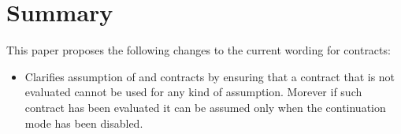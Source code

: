 \section{Summary}

This paper proposes the following changes to the current wording for contracts:

\begin{itemize}

\item Clarifies assumption of  and  contracts by
ensuring that a contract that is not evaluated cannot be used for any kind of
assumption. Morever if such contract has been evaluated it can be assumed only
when the continuation mode has been disabled.

\end{itemize}
